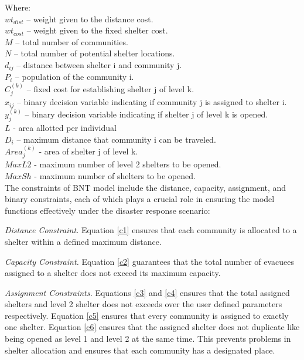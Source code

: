 	Where:
	\\$wt_{dist}$ – weight given to the distance cost.
	\\$wt_{cost}$ – weight given to the fixed shelter cost.
	\\$M$ – total number of communities.
	\\$N$ – total number of potential shelter locations.
	\\$d_{ij}$ – distance between shelter i and community j.
	\\$P_{i}$ – population of the community i.
	\\$C_{j}^{(k)}$ – fixed cost for establishing shelter j of level k.
	\\$x_{ij}$ – binary decision variable indicating if community j is assigned to shelter i.
	\\$y_{j}^{(k)}$ – binary decision variable indicating if shelter j of level k is opened.
	\\$L$ - area allotted per individual
	\\$D_{i}$ – maximum distance that community i can be traveled.
	\\$Area_{j}^{(k)}$ - area of shelter j of level k.
	\\$MaxL2$ - maximum number of level 2 shelters to be opened.
	\\$MaxSh$ - maximum number of shelters to be opened.
	\\
	
	The constraints of BNT model include the distance, capacity, assignment, and binary constraints, each of which plays a crucial role in ensuring the model functions effectively under the disaster response scenario:
	
	\textit{Distance Constraint.} Equation \ref{c1} ensures that each community is allocated to a shelter within a defined maximum distance. 
	
	\textit{Capacity Constraint.} Equation \ref{c2} guarantees that the total number of evacuees assigned to a shelter does not exceed its maximum capacity. 
	
	\textit{Assignment Constraints.} Equations \ref{c3} and \ref{c4} ensures that the total assigned shelters and level 2 shelter does not exceeds over the user defined parameters respectively.  Equation \ref{c5} ensures that every community is assigned to exactly one shelter. Equation \ref{c6} ensures that the assigned shelter does not duplicate like being opened as level 1 and level 2 at the same time. This prevents problems in shelter allocation and ensures that each community has a designated place.
	
